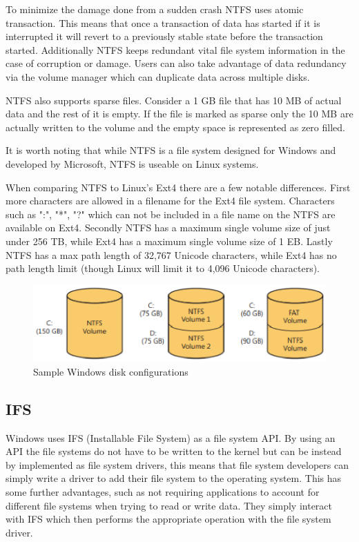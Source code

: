 \documentclass[letterpaper, 10pt, onecolumn, draftclsnofoot]{IEEEtran}
\begin{document}
To minimize the damage done from a sudden crash NTFS uses atomic transaction. This means that once a transaction of data has started if it is interrupted it will revert to a previously stable state before the transaction started. Additionally NTFS keeps redundant vital file system information in the case of corruption or damage. Users can also take advantage of data redundancy via the volume manager which can duplicate data across multiple disks.\cite{wi_p2}

NTFS also supports sparse files. Consider a 1 GB file that has 10 MB of actual data and the rest of it is empty. If the file is marked as sparse only the 10 MB are actually written to the volume and the empty space is represented as zero filled.\cite{wi_p2}

It is worth noting that while NTFS is a file system designed for Windows and developed by Microsoft, NTFS is useable on Linux systems.\cite{linux}

When comparing NTFS to Linux's Ext4 there are a few notable differences. First more characters are allowed in a filename for the Ext4 file system. Characters such as ":", "*", "?" which can not be included in a file name on the NTFS are available on Ext4. Secondly NTFS has a maximum single volume size of just under 256 TB, while Ext4 has a maximum single volume size of 1 EB. Lastly NTFS has a max path length of 32,767 Unicode characters, while Ext4 has no path length limit (though Linux will limit it to 4,096 Unicode characters).\cite{ntfs, salter}

\begin{figure}[H]
  \caption{Sample Windows disk configurations\cite{wi_p2}}
  \includegraphics[scale=1]{dcd.eps}
\end{figure}

\subsection{IFS}
Windows uses IFS (Installable File System) as a file system API. By using an API the file systems do not have to be written to the kernel but can be instead by implemented as file system drivers, this means that file system developers can simply write a driver to add their file system to the operating system. This has some further advantages, such as not requiring applications to account for different file systems when trying to read or write data. They simply interact with IFS which then performs the appropriate operation with the file system driver.\cite{ifs}
\end{document}
